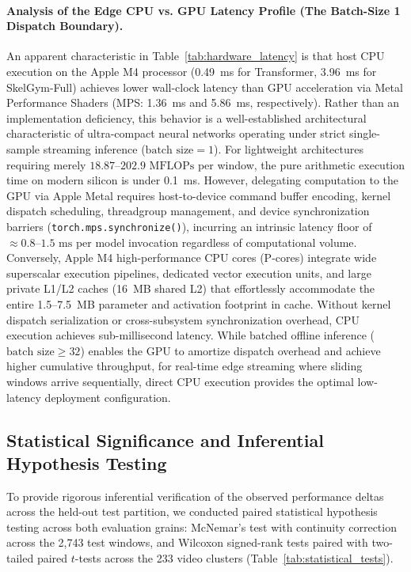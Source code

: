 \documentclass[preprint,12pt]{elsarticle}
\begin{document}
\paragraph{Analysis of the Edge CPU vs. GPU Latency Profile (The Batch-Size 1 Dispatch Boundary).}
An apparent characteristic in Table~\ref{tab:hardware_latency} is that host CPU execution on the Apple M4 processor (0.49~ms for Transformer, 3.96~ms for SkelGym-Full) achieves lower wall-clock latency than GPU acceleration via Metal Performance Shaders (MPS: 1.36~ms and 5.86~ms, respectively). Rather than an implementation deficiency, this behavior is a well-established architectural characteristic of ultra-compact neural networks operating under strict single-sample streaming inference ($\text{batch size} = 1$). For lightweight architectures requiring merely $18.87\text{--}202.9\text{ MFLOPs}$ per window, the pure arithmetic execution time on modern silicon is under 0.1~ms. However, delegating computation to the GPU via Apple Metal requires host-to-device command buffer encoding, kernel dispatch scheduling, threadgroup management, and device synchronization barriers (\texttt{torch.mps.synchronize()}), incurring an intrinsic latency floor of $\approx 0.8\text{--}1.5\text{ ms}$ per model invocation regardless of computational volume. Conversely, Apple M4 high-performance CPU cores (P-cores) integrate wide superscalar execution pipelines, dedicated vector execution units, and large private L1/L2 caches (16~MB shared L2) that effortlessly accommodate the entire 1.5--7.5~MB parameter and activation footprint in cache. Without kernel dispatch serialization or cross-subsystem synchronization overhead, CPU execution achieves sub-millisecond latency. While batched offline inference ($\text{batch size} \ge 32$) enables the GPU to amortize dispatch overhead and achieve higher cumulative throughput, for real-time edge streaming where sliding windows arrive sequentially, direct CPU execution provides the optimal low-latency deployment configuration.

\subsection{Statistical Significance and Inferential Hypothesis Testing}
\label{sec:statistics}

To provide rigorous inferential verification of the observed performance deltas across the held-out test partition, we conducted paired statistical hypothesis testing across both evaluation grains: McNemar's test with continuity correction \cite{mcnemar1947} across the 2,743 test windows, and Wilcoxon signed-rank tests \cite{wilcoxon1945} paired with two-tailed paired $t$-tests across the 233 video clusters (Table~\ref{tab:statistical_tests}).
\end{document}
